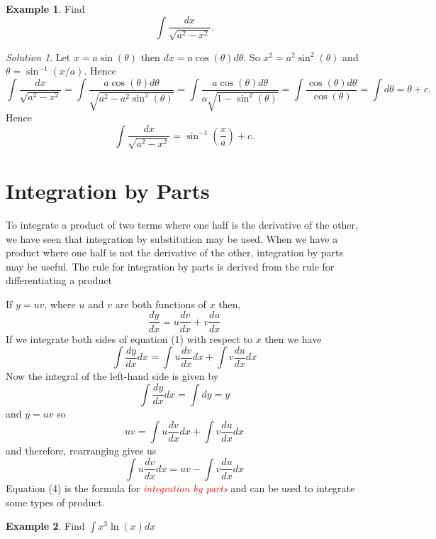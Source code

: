 \documentclass[
  11pt,
  oneside]{book}
\newcommand{\slide}{}
\newcommand{\cpybx}{}
\newcommand{\ecpybx}{}
\theoremstyle{definition}
\theoremstyle{definition}
\newtheorem{example}{Example}[chapter]
\theoremstyle{definition}
\theoremstyle{definition}
\theoremstyle{remark}
\newtheorem*{solution}{Solution}
\begin{document}
\slide

\cpybx

\begin{example}
Find
\[
\int\frac{dx}{\sqrt{a^2-x^2}}.
\]
\end{example}

\ecpybx\slide\copy\copybox

\begin{solution}
Let \(x = a\sin(\theta)\) then \(dx = a\cos(\theta)d\theta\). So \(x^2 = a^2\sin^2(\theta)\) and \(\theta = \sin^{-1}(x/a)\). Hence
\[
\int\frac{dx}{\sqrt{a^2-x^2}} = \int\frac{a\cos(\theta)d\theta}{\sqrt{a^2-a^2\sin^2(\theta)}} = \int\frac{a\cos(\theta)d\theta}{a\sqrt{1-\sin^2(\theta)}} = \int\frac{\cos(\theta)d\theta}{\cos(\theta)} = \int d\theta = \theta + c.
\]
Hence
\[
\int\frac{dx}{\sqrt{a^2-x^2}} = \sin^{-1}\left(\frac xa\right) + c.
\]
\end{solution}

\slide

\section{Integration by Parts}\label{integration-by-parts}

To integrate a product of two terms where one half is the derivative of the other, we have seen that integration by substitution may be used. When we have a product where one half is not the derivative of the other, integration by parts may be useful. The rule for integration by parts is derived from the rule for differentiating a product

If \(y = uv\), where \(u\) and \(v\) are both functions of \(x\) then,
\[
\frac{dy}{dx} = u\frac{dv}{dx} + v\frac{du}{dx}\tag{1}
\]
If we integrate both sides of equation (1) with respect to \(x\) then we have
\[
\int\frac{dy}{dx}dx = \int u\frac{dv}{dx}dx + \int v\frac{du}{dx}dx\tag{2}
\]
Now the integral of the left-hand side is given by
\[
\int\frac{dy}{dx}dx = \int dy = y
\]
and \(y = uv\) so
\[
uv =\int u\frac{dv}{dx}dx +\int v\frac{du}{dx}dx\tag{3}
\]
and therefore, rearranging gives us
\[
\int u\frac{dv}{dx}dx = uv -\int v\frac{du}{dx}dx\tag{4}
\]
Equation (4) is the formula for \textcolor{red}{\em integration by parts} and can be used to integrate some types of
product.

\slide

\begin{example}
Find \(\displaystyle\int x^3\ln(x)dx\)
\end{example}
\end{document}
